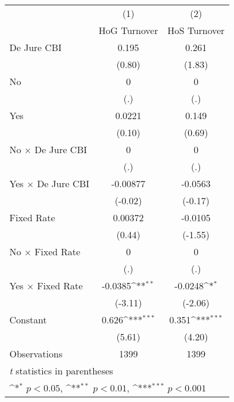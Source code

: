 \begin{table}[htbp]\centering
\def\sym#1{\ifmmode^{#1}\else\(^{#1}\)\fi}
\caption{\label{hoshogmultIndFEDJ}}
\begin{tabular}{l*{2}{c}}
\toprule
                                        &\multicolumn{1}{c}{(1)}&\multicolumn{1}{c}{(2)}\\
                                        &\multicolumn{1}{c}{HoG Turnover}&\multicolumn{1}{c}{HoS Turnover}\\
\midrule
De Jure CBI                             &    0.195         &    0.261         \\
                                        &   (0.80)         &   (1.83)         \\
\addlinespace
No                                      &        0         &        0         \\
                                        &      (.)         &      (.)         \\
\addlinespace
Yes                                     &   0.0221         &    0.149         \\
                                        &   (0.10)         &   (0.69)         \\
\addlinespace
No $\times$ De Jure CBI                 &        0         &        0         \\
                                        &      (.)         &      (.)         \\
\addlinespace
Yes $\times$ De Jure CBI                & -0.00877         &  -0.0563         \\
                                        &  (-0.02)         &  (-0.17)         \\
\addlinespace
Fixed Rate                              &  0.00372         &  -0.0105         \\
                                        &   (0.44)         &  (-1.55)         \\
\addlinespace
No $\times$ Fixed Rate                  &        0         &        0         \\
                                        &      (.)         &      (.)         \\
\addlinespace
Yes $\times$ Fixed Rate                 &  -0.0385\sym{**} &  -0.0248\sym{*}  \\
                                        &  (-3.11)         &  (-2.06)         \\
\addlinespace
Constant                                &    0.626\sym{***}&    0.351\sym{***}\\
                                        &   (5.61)         &   (4.20)         \\
\midrule
Observations                            &     1399         &     1399         \\
\bottomrule
\multicolumn{3}{l}{\footnotesize \textit{t} statistics in parentheses}\\
\multicolumn{3}{l}{\footnotesize \sym{*} \(p<0.05\), \sym{**} \(p<0.01\), \sym{***} \(p<0.001\)}\\
\end{tabular}
\end{table}

